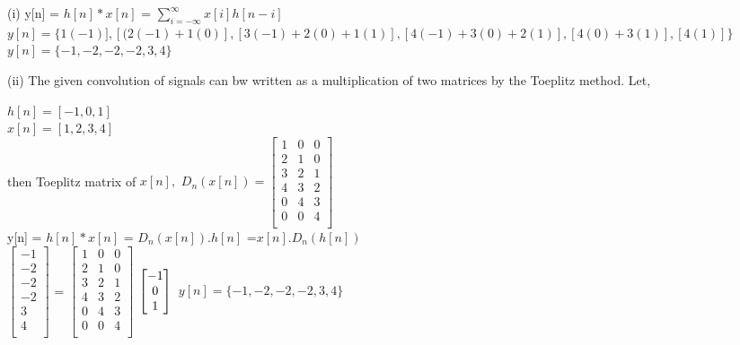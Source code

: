 \documentclass[answers]{exam}
\begin{document}
\begin{solution}
(i) y[n] =  $h[n] * x[n]$ = $\sum_{i=-\infty}^{\infty} x[i]h[n-i]$ \\
{\small $y[n] =\{ 1(-1)], [(2(-1) + 1(0)], [3(-1) + 2(0) + 1(1)], [4(-1) + 3(0) + 2(1)], [4(0) + 3(1)], [4(1)]\}$\\}
$y[n] =\{-1, -2, -2, -2, 3, 4\}$

(ii) The given convolution of signals can bw written as a multiplication of two matrices by the Toeplitz method. 
Let,

$h[n] = [-1, 0, 1]$\\
$x[n] = [1, 2, 3, 4]$\\


then Toeplitz matrix of $x[n],$ $ D_n(x[n]) = \begin{bmatrix}
1 & 0 & 0\\
2 & 1 & 0\\
3 & 2 & 1\\
4 & 3 & 2\\
0 & 4 & 3\\
0 & 0 & 4\\
\end{bmatrix}$\\

y[n] =  $h[n] * x[n]$ = $D_n(x[n]) .  h[n]$ =$x[n]. D_n(h[n])$\\
$
\begin{bmatrix}
-1\\
-2\\
-2\\
-2\\
3\\
4\\
\end{bmatrix}
$
=
$
\begin{bmatrix}
1 & 0 & 0\\
2 & 1 & 0\\
3 & 2 & 1\\
4 & 3 & 2\\
0 & 4 & 3\\
0 & 0 & 4\\
\end{bmatrix}
$
$
\begin{bmatrix}
-1\\
0\\
1\\
\end{bmatrix} \\
$
$y[n] =\{-1, -2, -2, -2, 3, 4\}$

\end{solution}
\newpage
\end{document}
